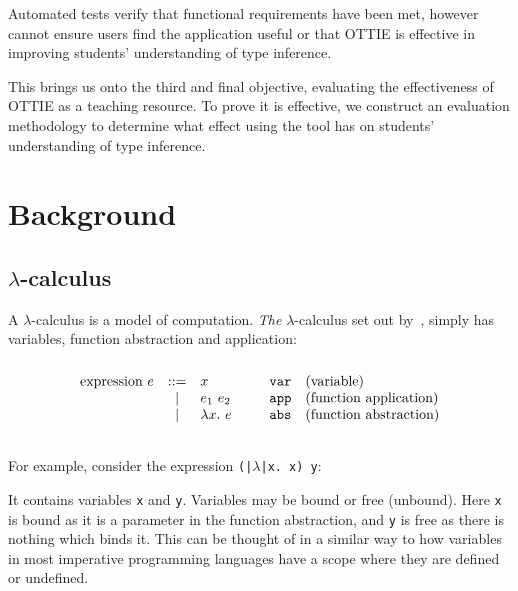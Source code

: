 \documentclass[a4paper,fleqn,oneside,12pt]{report}
\begin{document}
Automated tests verify that functional requirements have been met, however cannot ensure users find the application useful or that OTTIE is effective in improving students' understanding of type inference.

This brings us onto the third and final objective, evaluating the effectiveness of OTTIE as a teaching resource. To prove it is effective, we construct an evaluation methodology to determine what effect using the tool has on students' understanding of type inference.

\chapter{Background}\label{id:h.ebjyqi73zdyo}

\section{\texorpdfstring{$\lambda$-}{Lambda }calculus}\label{id:h.odw4vku9eizz}

A $\lambda$-calculus is a model of computation. \textit{The} $\lambda$-calculus set out by~\cite{ref10}, simply has variables, function abstraction and application:
$$\begin{array}{lcllll}
  \\
    \textrm{expression}\ e & ::= & x                       & \hspace{0.25cm} & \mathtt{var} & \textrm{(variable)}\\
                         & \vert & e_1\ e_2                                & & \mathtt{app} & \textrm{(function application)}\\
                         & \vert & \lambda x.\ e                           & & \mathtt{abs} & \textrm{(function abstraction)} \\
  \\
\end{array}$$

For example, consider the expression \texttt{(|$\lambda$|x. x) y}:

It contains variables \texttt{x} and \texttt{y}. Variables may be bound or free (unbound). Here \texttt{x} is bound as it is a parameter in the function abstraction, and \texttt{y} is free as there is nothing which binds it. This can be thought of in a similar way to how variables in most imperative programming languages have a scope where they are defined or undefined.
\end{document}
